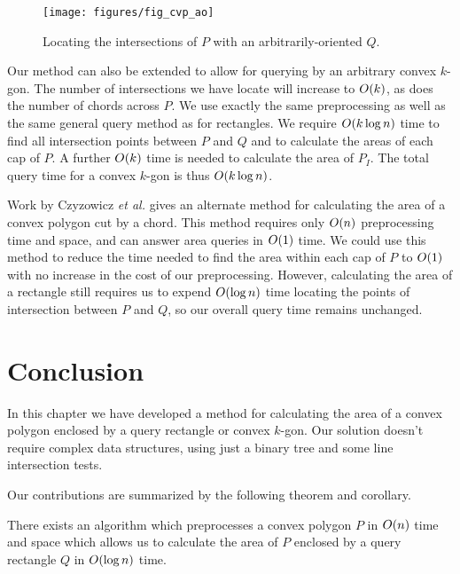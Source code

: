 \begin{figure}[t]
\begin{center}
  \texttt{[image: figures/fig\_cvp\_ao]}
  \caption{Locating the intersections of $P$ with an arbitrarily-oriented $Q$.}
  \label{fig:convexp:ao}
\end{center}
\end{figure}

Our method can also be extended to allow for querying by an arbitrary convex $k$-gon.
The number of intersections we have locate will increase to $O\!\left(k\right)$, as does the number of chords across $P$.
We use exactly the same preprocessing as well as the same general query method as for rectangles. 
We require $O\!\left(k \log{n}\right)$ time to find all intersection points between $P$ and $Q$ and to calculate the areas of each cap of $P$. A further $O\!\left(k\right)$ time is needed to calculate the area of $P_I$. 
The total query time for a convex $k$-gon is thus $O\!\left(k \log{n}\right)$.

Work by Czyzowicz \textit{et al.}\cite{DBLP:conf/cccg/CzyzowiczCU98} gives an alternate method for calculating the area of a convex polygon cut by a chord.  This method requires only $O\!\left(n\right)$ preprocessing time and space, and can answer area queries in $O\!\left(1\right)$ time. We could use this method to reduce the time needed to find the area within each cap of $P$ to $O\!\left(1\right)$ with no increase in the cost of our preprocessing. However, calculating the area of a rectangle still requires us to expend $O\!\left(\log{n}\right)$ time locating the points of intersection between $P$ and $Q$, so our overall query time remains unchanged.


\section{Conclusion}
\label{:convexp:concl}

In this chapter we have developed a method for calculating the area of a convex polygon enclosed by a query rectangle or convex $k$-gon. Our solution doesn't require complex data structures, using just a binary tree and some line intersection tests.

Our contributions are summarized by the following theorem and corollary.

\begin{theorem}
\label{th:convexp:area}
There exists an algorithm which preprocesses a convex polygon $P$ in $O\!\left(n\right)$ time and space which allows us to calculate the area of $P$ enclosed by a query rectangle $Q$ in $O\!\left(\log{n}\right)$ time.
\end{theorem}

